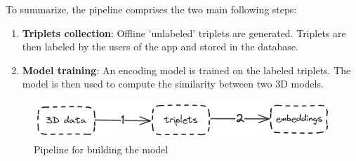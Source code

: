 To summarize, the pipeline comprises the two main following steps:
\begin{enumerate}
    \item \textbf{Triplets collection}: Offline 'unlabeled' triplets are generated. Triplets are then labeled by the users of the app and stored in the database.
    \item \textbf{Model training}: An encoding model is trained on the labeled triplets. The model is then used to compute the similarity between two 3D models.
\end{enumerate}

\begin{figure}[]
    \centering
    \includegraphics[width=0.8\columnwidth]{images/steps.png}
    \caption{Pipeline for building the model}   
    \label{fig:steps}
\end{figure}